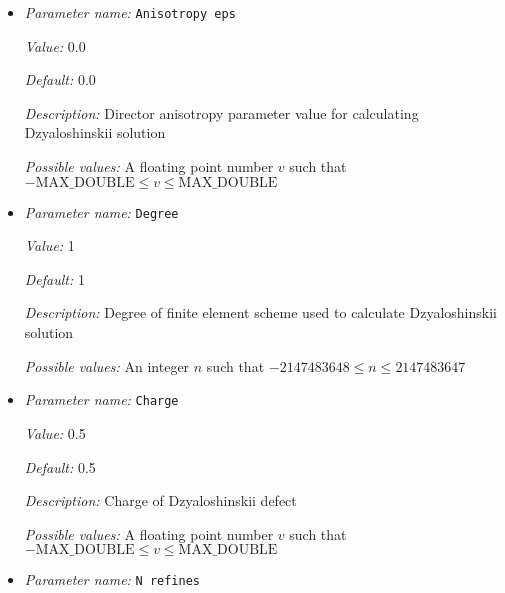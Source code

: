 \begin{itemize}
\item {\it Parameter name:} {\tt Anisotropy eps}
\label{parameters:Nematic system MPI/Boundary values/Dzyaloshinskii/Anisotropy eps}
\label{parameters:Nematic_20system_20MPI/Boundary_20values/Dzyaloshinskii/Anisotropy_20eps}


{\it Value:} 0.0


{\it Default:} 0.0


{\it Description:} Director anisotropy parameter value for calculating Dzyaloshinskii solution


{\it Possible values:} A floating point number $v$ such that $-\text{MAX\_DOUBLE} \leq v \leq \text{MAX\_DOUBLE}$
\item {\it Parameter name:} {\tt Degree}
\label{parameters:Nematic system MPI/Boundary values/Dzyaloshinskii/Degree}
\label{parameters:Nematic_20system_20MPI/Boundary_20values/Dzyaloshinskii/Degree}


{\it Value:} 1


{\it Default:} 1


{\it Description:} Degree of finite element scheme used to calculate Dzyaloshinskii solution


{\it Possible values:} An integer $n$ such that $-2147483648\leq n \leq 2147483647$
\item {\it Parameter name:} {\tt Charge}
\label{parameters:Nematic system MPI/Boundary values/Dzyaloshinskii/Charge}
\label{parameters:Nematic_20system_20MPI/Boundary_20values/Dzyaloshinskii/Charge}


{\it Value:} 0.5


{\it Default:} 0.5


{\it Description:} Charge of Dzyaloshinskii defect


{\it Possible values:} A floating point number $v$ such that $-\text{MAX\_DOUBLE} \leq v \leq \text{MAX\_DOUBLE}$
\item {\it Parameter name:} {\tt N refines}
\label{parameters:Nematic system MPI/Boundary values/Dzyaloshinskii/N refines}
\label{parameters:Nematic_20system_20MPI/Boundary_20values/Dzyaloshinskii/N_20refines}



\end{itemize}

